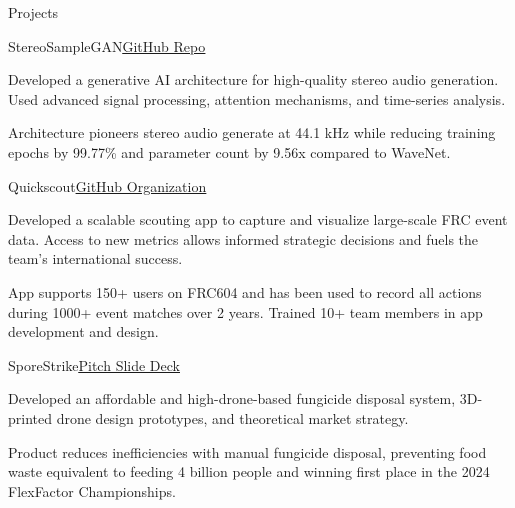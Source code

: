 \documentclass[
  11pt, %
]{resume}
\begin{document}
\begin{rSection}{Projects}

  
  \begin{rSubsection}{StereoSampleGAN}{}{\underline{\href{https://github.com/shuklabhay/stereo-sample-gan}{GitHub Repo}}}{}
       
    \item Developed a generative AI architecture for high-quality stereo audio generation. Used advanced signal processing, attention mechanisms, and time-series analysis.
        
    \item Architecture pioneers stereo audio generate at 44.1 kHz while reducing training epochs by 99.77\% and parameter count by 9.56x compared to WaveNet.
        
  \end{rSubsection}
      
  \begin{rSubsection}{Quickscout}{}{\underline{\href{https://github.com/frc604}{GitHub Organization}}}{}
       
    \item Developed a scalable scouting app to capture and visualize large-scale FRC event data. Access to new metrics allows informed strategic decisions and fuels the team's international success.
        
    \item App supports 150+ users on FRC604 and has been used to record all actions during 1000+ event matches over 2 years. Trained 10+ team members in app development and design.
        
  \end{rSubsection}
      
  \begin{rSubsection}{SporeStrike}{}{\underline{\href{https://shuklabhay.github.io/static/projects/sporestrike/FlexFactor_SporeStrike_pitch.pdf}{Pitch Slide Deck}}}{}
       
    \item Developed an affordable and high-drone-based fungicide disposal system, 3D-printed drone design prototypes, and theoretical market strategy.
        
    \item Product reduces inefficiencies with manual fungicide disposal, preventing food waste equivalent to feeding 4 billion people and winning first place in the 2024 FlexFactor Championships.
        
  \end{rSubsection}
      
	
\end{rSection}
    
\end{document}
